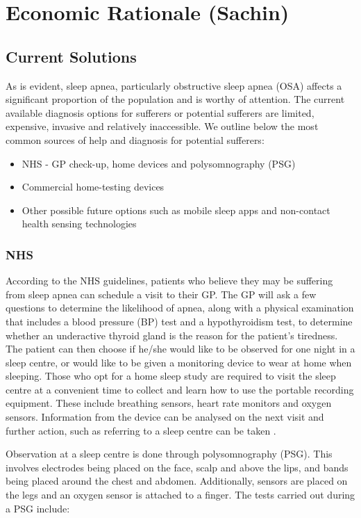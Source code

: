 \section{Economic Rationale (Sachin)}
\label{sec:economics-sachin}

\subsection{Current Solutions}

	As is evident, sleep apnea, particularly obstructive sleep apnea (OSA)
affects a significant proportion of the population and is worthy of
attention. The current available diagnosis options for sufferers or
potential sufferers are limited, expensive, invasive and relatively
inaccessible. We outline below the most common sources of help and
diagnosis for potential sufferers:
	\begin{itemize}
	\item NHS - GP check-up, home devices and polysomnography (PSG)
	\item Commercial home-testing devices
	\item Other possible future options such as mobile sleep apps and non-contact
health sensing technologies
	\end{itemize}

\subsubsection{NHS}

According to the NHS guidelines, patients who believe they may be suffering from sleep apnea can schedule a visit to their GP. The GP will ask a few questions to determine the likelihood of apnea, along with a physical examination that includes a blood pressure (BP) test and a hypothyroidism test, to determine whether an underactive thyroid gland is the reason for the patient's tiredness. The patient can then choose if he/she would like to be observed for one night in a sleep
centre, or would like to be given a monitoring device to wear at home when sleeping. Those who opt for a home sleep study are required to visit the sleep centre at a convenient time to collect and learn how to use the portable recording equipment. These include breathing sensors, heart rate monitors and oxygen sensors. Information from the device can be analysed on the next visit and further action, such as referring to a sleep centre can be taken \cite{nhsdiag,nhsmain}.

Observation at a sleep centre is done through polysomnography (PSG). This involves electrodes being placed on the face, scalp and above the lips, and bands being placed around the chest and abdomen. Additionally, sensors are placed on the legs and an oxygen sensor is attached to a finger. The tests carried out during a PSG include:

